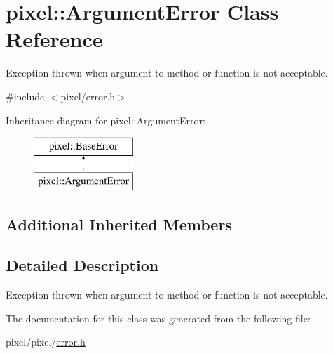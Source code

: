 \hypertarget{classpixel_1_1_argument_error}{}\section{pixel\+:\+:Argument\+Error Class Reference}
\label{classpixel_1_1_argument_error}


Exception thrown when argument to method or function is not acceptable.  




{\ttfamily \#include $<$pixel/error.\+h$>$}

Inheritance diagram for pixel\+:\+:Argument\+Error\+:\begin{figure}[H]
\begin{center}
\leavevmode
\includegraphics[height=2.000000cm]{classpixel_1_1_argument_error}
\end{center}
\end{figure}
\subsection*{Additional Inherited Members}


\subsection{Detailed Description}
Exception thrown when argument to method or function is not acceptable. 

The documentation for this class was generated from the following file\+:\begin{DoxyCompactItemize}
\item 
pixel/pixel/\hyperlink{error_8h}{error.\+h}\end{DoxyCompactItemize}
